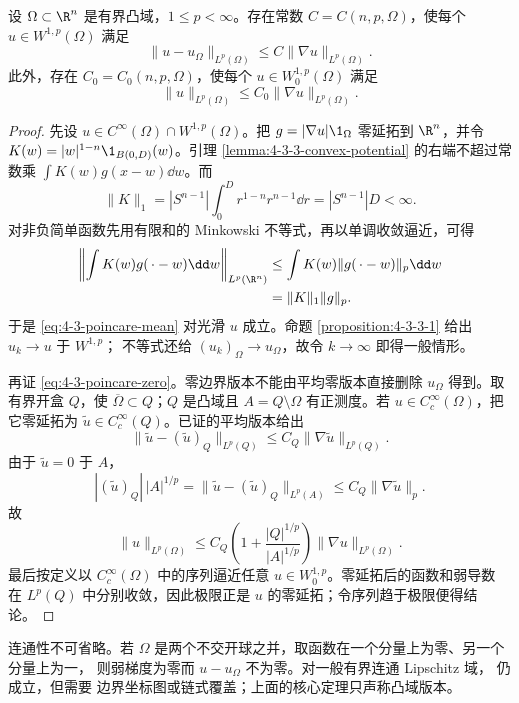 \begin{theorem}\label{theorem:4-3-3-2}
设 $\Omega\subset\R^n$ 是有界凸域，$1\leq p<\infty$。存在常数
$C=C(n,p,\Omega)$，使每个 $u\in W^{1,p}(\Omega)$ 满足
\[
 \|u-u_\Omega\|_{L^p(\Omega)}
 \leq C\|\nabla u\|_{L^p(\Omega)}.
 \tag{4.3.12}\label{eq:4-3-poincare-mean}
\]
此外，存在 $C_0=C_0(n,p,\Omega)$，使每个 $u\in W_0^{1,p}(\Omega)$ 满足
\[
 \|u\|_{L^p(\Omega)}\leq C_0\|\nabla u\|_{L^p(\Omega)}.
 \tag{4.3.13}\label{eq:4-3-poincare-zero}
\]
\end{theorem}

\begin{proof}
先设 $u\in C^\infty(\Omega)\cap W^{1,p}(\Omega)$。把
$g=|\nabla u|\1_\Omega$ 零延拓到 $\R^n$，并令
$K(w)=|w|^{1-n}\1_{B(0,D)}(w)$。引理
\ref{lemma:4-3-3-convex-potential} 的右端不超过常数乘
$\int K(w)g(x-w)\dd w$。而
\[
 \|K\|_1
 =|S^{n-1}|\int_0^D r^{1-n}r^{n-1}\dd r
 =|S^{n-1}|D<\infty.
\]
对非负简单函数先用有限和的 Minkowski 不等式，再以单调收敛逼近，可得
\begin{align*}
 \left\|\int K(w)g(\,\cdot-w)\dd w\right\|_{L^p(\R^n)}
 &\leq\int K(w)\|g(\,\cdot-w)\|_p\dd w\\
 &=\|K\|_1\|g\|_p.
\end{align*}
于是 \eqref{eq:4-3-poincare-mean} 对光滑 $u$ 成立。命题
\ref{proposition:4-3-3-1} 给出 $u_k\to u$ 于 $W^{1,p}$；\Holder{} 不等式还给
$(u_k)_\Omega\to u_\Omega$，故令 $k\to\infty$ 即得一般情形。

再证 \eqref{eq:4-3-poincare-zero}。零边界版本不能由平均零版本直接删除 $u_\Omega$ 得到。取有界开盒
$Q$，使 $\overline\Omega\subset Q$；$Q$ 是凸域且 $A=Q\setminus\Omega$ 有正测度。若
$u\in C_c^\infty(\Omega)$，把它零延拓为 $\widetilde u\in C_c^\infty(Q)$。已证的平均版本给出
\[
 \|\widetilde u-(\widetilde u)_Q\|_{L^p(Q)}
 \leq C_Q\|\nabla\widetilde u\|_{L^p(Q)}.
\]
由于 $\widetilde u=0$ 于 $A$，
\[
 |(\widetilde u)_Q|\,|A|^{1/p}
 =\|\widetilde u-(\widetilde u)_Q\|_{L^p(A)}
 \leq C_Q\|\nabla\widetilde u\|_p.
\]
故
\[
 \|u\|_{L^p(\Omega)}
 \leq C_Q\left(1+\frac{|Q|^{1/p}}{|A|^{1/p}}\right)
       \|\nabla u\|_{L^p(\Omega)}.
\]
最后按定义以 $C_c^\infty(\Omega)$ 中的序列逼近任意 $u\in W_0^{1,p}$。零延拓后的函数和弱导数
在 $L^p(Q)$ 中分别收敛，因此极限正是 $u$ 的零延拓；令序列趋于极限便得结论。
\end{proof}

连通性不可省略。若 $\Omega$ 是两个不交开球之并，取函数在一个分量上为零、另一个分量上为一，
则弱梯度为零而 $u-u_\Omega$ 不为零。对一般有界连通 Lipschitz 域，\Poincare{} 仍成立，但需要
边界坐标图或链式覆盖；上面的核心定理只声称凸域版本。

